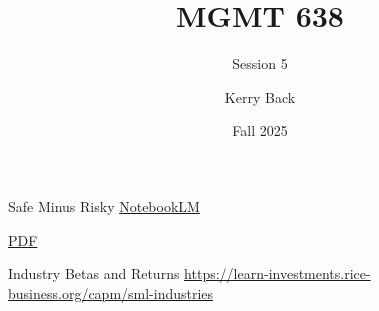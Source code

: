 \documentclass[aspectratio=169]{beamer}
\title{MGMT 638}
\subtitle{Session 5}
\author{Kerry Back}
\institute{}
\date{Fall 2025}
\begin{document}
\maketitle

\begin{frame}{Safe Minus Risky}
\centering
\Large
\href{https://notebooklm.google.com/notebook/58351fb6-7453-4bff-909f-281bb34e4c6a}{NotebookLM}

\vspace{1em}

\href{https://mgmt638.kerryback.com/Kapadia_Ostdiek_Weston_Zekhnini_JFQA_2019.pdf}{PDF}
\end{frame}

\begin{frame}{Industry Betas and Returns}
\centering
\Large
\url{https://learn-investments.rice-business.org/capm/sml-industries}
\end{frame}
\end{document}
